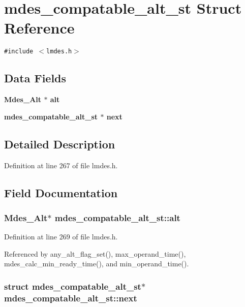 \section{mdes\_\-compatable\_\-alt\_\-st Struct Reference}
\label{structmdes__compatable__alt__st}
{\tt \#include $<$lmdes.h$>$}

\subsection*{Data Fields}
\begin{CompactItemize}
\item 
\bf{Mdes\_\-Alt} $\ast$ \bf{alt}
\item 
\bf{mdes\_\-compatable\_\-alt\_\-st} $\ast$ \bf{next}
\end{CompactItemize}


\subsection{Detailed Description}




Definition at line 267 of file lmdes.h.

\subsection{Field Documentation}
\subsubsection{\setlength{\rightskip}{0pt plus 5cm}\bf{Mdes\_\-Alt}$\ast$ \bf{mdes\_\-compatable\_\-alt\_\-st::alt}}\label{structmdes__compatable__alt__st_5319d7027ebc3bff310086ea313080c7}




Definition at line 269 of file lmdes.h.

Referenced by any\_\-alt\_\-flag\_\-set(), max\_\-operand\_\-time(), mdes\_\-calc\_\-min\_\-ready\_\-time(), and min\_\-operand\_\-time().
\subsubsection{\setlength{\rightskip}{0pt plus 5cm}struct \bf{mdes\_\-compatable\_\-alt\_\-st}$\ast$ \bf{mdes\_\-compatable\_\-alt\_\-st::next}}\label{structmdes__compatable__alt__st_14f426464c727abedf874de9c50776c1}




